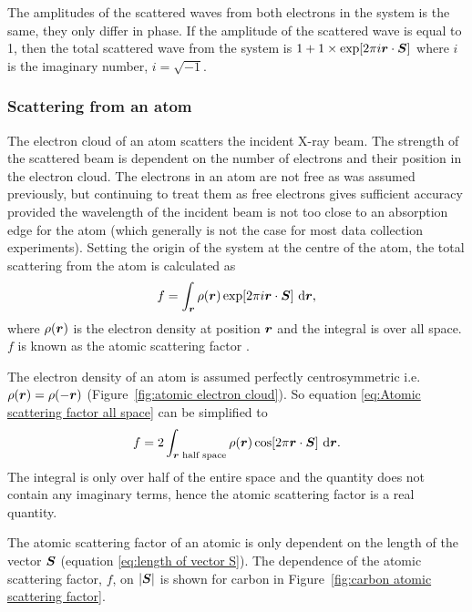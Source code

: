             The amplitudes of the scattered waves from both electrons in the system is the same, they only differ in phase. If the amplitude of the scattered wave is equal to 1, then the total scattered wave from the system is $1 + 1 \times \exp[2 \pi i \boldsymbol{r} \cdot \boldsymbol{S}]$ where $i$ is the imaginary number, $i = \sqrt{-1}$.

        \subsubsection{Scattering from an atom}
        \label{subs:Scattering from an atom}
            The electron cloud of an atom scatters the incident X-ray beam. The strength of the scattered beam is dependent on the number of electrons and their position in the electron cloud. The electrons in an atom are not free as was assumed previously, but continuing to treat them as free electrons gives sufficient accuracy provided the wavelength of the incident beam is not too close to an absorption edge for the atom \cite{drenth2012} (which generally is not the case for most data collection experiments). Setting the origin of the system at the centre of the atom, the total scattering from the atom is calculated as
            \begin{equation}
                f = \int_{\boldsymbol{r}} \rho(\boldsymbol{r}) \exp[2 \pi i \boldsymbol{r} \cdot \boldsymbol{S}]\ \mathrm{d}\boldsymbol{r},
                \label{eq:Atomic scattering factor all space}
            \end{equation}
            where $\rho(\boldsymbol{r})$ is the electron density at position $\boldsymbol{r}$ and the integral is over all space. $f$ is known as the atomic scattering factor \cite{drenth1999}.

            The electron density of an atom is assumed perfectly centrosymmetric i.e. $\rho(\boldsymbol{r}) = \rho(-\boldsymbol{r})$ (Figure~\ref{fig:atomic electron cloud}). So equation \ref{eq:Atomic scattering factor all space} can be simplified to
            \begin{equation}
                f = 2 \int_{\boldsymbol{r}\text{ half space}} \rho(\boldsymbol{r}) \cos[2 \pi \boldsymbol{r} \cdot \boldsymbol{S}]\ \mathrm{d}\boldsymbol{r}.
            \end{equation}
            The integral is only over half of the entire space and the quantity does not contain any imaginary terms, hence the atomic scattering factor is a real quantity.

            The atomic scattering factor of an atomic is only dependent on the length of the vector $\boldsymbol{S}$ (equation \ref{eq:length of vector S}). The dependence of the atomic scattering factor, $f$, on $|\boldsymbol{S}|$ is shown for carbon in Figure~\ref{fig:carbon atomic scattering factor}.

